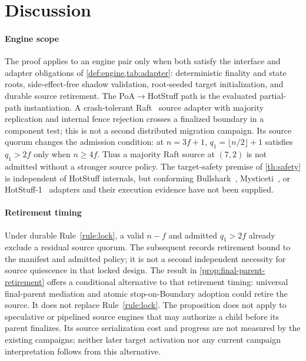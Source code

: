 \section{Discussion}
\label{sec:discussion}

\paragraph{Engine scope}
The proof applies to an engine pair only when both satisfy the interface and adapter
obligations of \cref{def:engine,tab:adapter}: deterministic finality and state
roots, side-effect-free shadow validation, root-seeded target initialization,
and durable source retirement. The PoA$\to$HotStuff path is the evaluated
partial-path instantiation. A crash-tolerant Raft~\cite{raft} source adapter
with majority replication and internal fence rejection crosses a finalized
boundary in a component test; this is not a second distributed migration
campaign. Its source quorum changes the admission condition: at $n=3f+1$,
$q_1=\lfloor n/2\rfloor+1$ satisfies $q_1>2f$ only when $n\ge4f$.
Thus a majority Raft source at $(7,2)$ is not admitted without a stronger
source policy. The target-safety premise of \cref{th:safety} is independent
of HotStuff internals, but conforming Bullshark~\cite{bullshark},
Mysticeti~\cite{mysticeti}, or HotStuff-1~\cite{hotstuff1} adapters and their
execution evidence have not been supplied.

\paragraph{Retirement timing}
Under durable Rule~\ref{rule:lock}, a valid $n-f$ \CutCert{} and admitted
$q_1>2f$ already exclude a residual source quorum. The subsequent \FenceCert{}
records retirement bound to the manifest and admitted policy; it is not a
second independent necessity for source quiescence in that locked design.
The result in \cref{prop:final-parent-retirement} offers a conditional alternative
to that retirement timing: universal final-parent mediation and atomic stop-on-Boundary
adoption could retire the source. It does not replace Rule~\ref{rule:lock}. The proposition
does not apply to speculative or pipelined source engines that may authorize a
child before its parent finalizes. Its source serialization cost and progress
are not measured by the existing campaigns; neither later target activation
nor any current campaign interpretation follows from this alternative.

